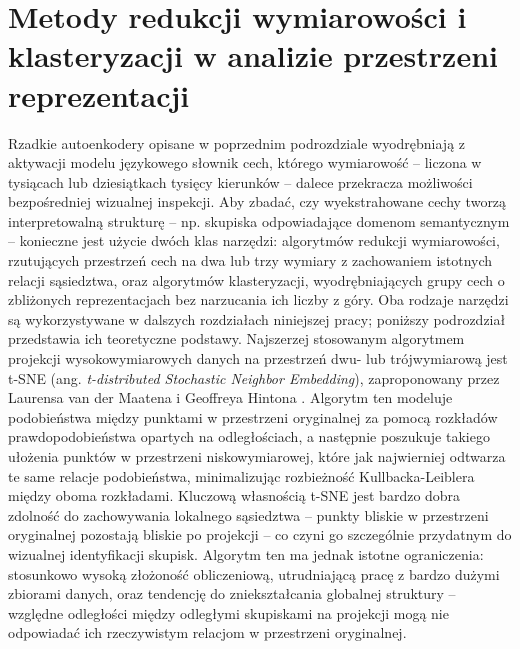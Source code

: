 \section{Metody redukcji wymiarowości i klasteryzacji w analizie przestrzeni reprezentacji}
\label{sec:redukcja_wymiarowosci}
Rzadkie autoenkodery opisane w poprzednim podrozdziale wyodrębniają z aktywacji modelu językowego słownik cech, którego wymiarowość -- liczona w tysiącach lub dziesiątkach tysięcy kierunków -- dalece przekracza możliwości bezpośredniej wizualnej inspekcji. Aby zbadać, czy wyekstrahowane cechy tworzą interpretowalną strukturę -- np. skupiska odpowiadające domenom semantycznym -- konieczne jest użycie dwóch klas narzędzi: algorytmów redukcji wymiarowości, rzutujących przestrzeń cech na dwa lub trzy wymiary z zachowaniem istotnych relacji sąsiedztwa, oraz algorytmów klasteryzacji, wyodrębniających grupy cech o zbliżonych reprezentacjach bez narzucania ich liczby z góry. Oba rodzaje narzędzi są wykorzystywane w dalszych rozdziałach niniejszej pracy; poniższy podrozdział przedstawia ich teoretyczne podstawy. \newline
Najszerzej stosowanym algorytmem projekcji wysokowymiarowych danych na przestrzeń dwu- lub trójwymiarową jest t-SNE (ang. \textit{t-distributed Stochastic Neighbor Embedding}), zaproponowany przez Laurensa van der Maatena i Geoffreya Hintona \cite{vandermaaten_2008_tsne}. Algorytm ten modeluje podobieństwa między punktami w przestrzeni oryginalnej za pomocą rozkładów prawdopodobieństwa opartych na odległościach, a następnie poszukuje takiego ułożenia punktów w przestrzeni niskowymiarowej, które jak najwierniej odtwarza te same relacje podobieństwa, minimalizując rozbieżność Kullbacka-Leiblera między oboma rozkładami. Kluczową własnością t-SNE jest bardzo dobra zdolność do zachowywania lokalnego sąsiedztwa -- punkty bliskie w przestrzeni oryginalnej pozostają bliskie po projekcji -- co czyni go szczególnie przydatnym do wizualnej identyfikacji skupisk. Algorytm ten ma jednak istotne ograniczenia: stosunkowo wysoką złożoność obliczeniową, utrudniającą pracę z bardzo dużymi zbiorami danych, oraz tendencję do zniekształcania globalnej struktury -- względne odległości między odległymi skupiskami na projekcji mogą nie odpowiadać ich rzeczywistym relacjom w przestrzeni oryginalnej. \newline
